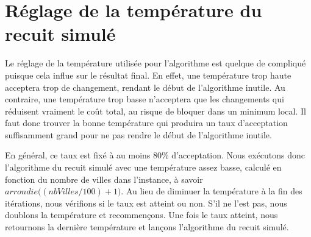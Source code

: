 \documentclass{article}
\begin{document}
\section{Réglage de la température du recuit simulé}

Le réglage de la température utilisée pour l'algorithme est quelque de compliqué puisque cela influe sur le résultat final.
En effet, une température trop haute acceptera trop de changement, rendant le début de l'algorithme inutile.
Au contraire, une température trop basse n'acceptera que les changements qui réduisent vraiment le coût total, au risque de bloquer dans un minimum local.
Il faut donc trouver la bonne température qui produira un taux d'acceptation suffisamment grand pour ne pas rendre le début de l'algorithme inutile.

En général, ce taux est fixé à au moins 80\% d'acceptation.
Nous exécutons donc l'algorithme du recuit simulé avec une température assez basse, calculé en fonction du nombre de villes dans l'instance, à savoir $arrondie\big((nbVilles / 100) + 1\big)$.
Au lieu de diminuer la température à la fin des itérations, nous vérifions si le taux est atteint ou non.
S'il ne l'est pas, nous doublons la température et recommençons.
Une fois le taux atteint, nous retournons la dernière température et lançons l'algorithme du recuit simulé.
\end{document}
